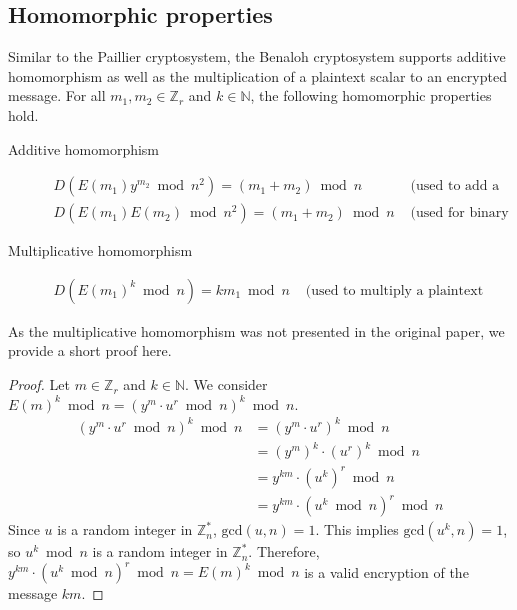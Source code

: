\subsection{Homomorphic properties}
Similar to the Paillier cryptosystem, the Benaloh cryptosystem supports additive homomorphism as well as the multiplication of a plaintext scalar to an encrypted message.
For all $m_1,m_2 \in \mathbb{Z}_r$ and $k\in \mathbb{N}$, the following homomorphic properties hold.
\begin{description}
  \item[Additive homomorphism]
  \begin{align*}
    D(E(m_1)y^{m_2}\bmod n^2)=(m_1+m_2)\bmod n & \text{ (used to add a constant)}\\
    D(E(m_1)E(m_2)\bmod n^2)=(m_1+m_2)\bmod n & \text{ (used for binary addition)}
  \end{align*}
  \item[Multiplicative homomorphism]
  \begin{align*}
    D(E(m_1)^k\bmod n)= km_1\bmod n & \text{ (used to multiply a plaintext constant)}
  \end{align*}
\end{description}

As the multiplicative homomorphism was not presented in the original paper, we provide a short proof here.
\begin{proof}
  Let $m \in \mathbb{Z}_r$ and $k\in \mathbb{N}$.
  We consider $E(m)^k\bmod n = (y^m \cdot u^r \bmod{n})^k\bmod n$.
  \begin{align*}
    (y^m \cdot u^r \bmod{n})^k\bmod n
    &= (y^m \cdot u^r)^k \bmod{n}\\
    &= (y^m)^k \cdot (u^r)^k \bmod{n}\\
    &= y^{km} \cdot (u^k)^r \bmod{n}\\
    &= y^{km} \cdot (u^k \bmod{n})^r \bmod{n}
  \end{align*}
  Since $u$ is a random integer in $\mathbb{Z}_n^*$, $\mathrm{gcd}(u,n)=1$.
  This implies $\mathrm{gcd}(u^k,n)=1$, so $u^k \bmod n$ is a random integer in $\mathbb{Z}_n^*$.
  Therefore, $y^{km} \cdot (u^k \bmod{n})^r \bmod{n} = E(m)^k\bmod n$ is a valid encryption of the message $km$.
\end{proof}
